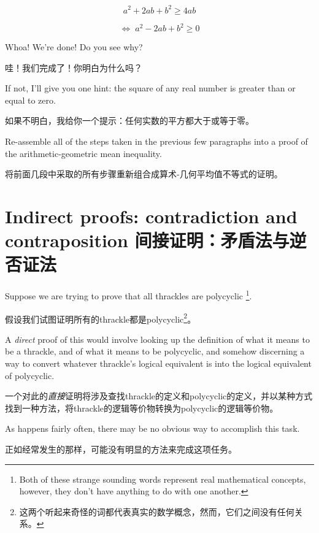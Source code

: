 \[  a^2+2ab+b^2 \geq 4ab \]

\[ \iff \; a^2-2ab+b^2 \geq 0 \]

Whoa!  We're done!  Do you see why?

哇！我们完成了！你明白为什么吗？

If not, I'll give you one
hint:  the square of any real number is greater than or equal to
zero.

如果不明白，我给你一个提示：任何实数的平方都大于或等于零。

\begin{exer}
      Re-assemble all of the steps taken in the previous few paragraphs
      into a proof of the arithmetic-geometric mean inequality.

      将前面几段中采取的所有步骤重新组合成算术-几何平均值不等式的证明。
\end{exer}


\clearpage




\newpage


\section[Contradiction and contraposition]{Indirect proofs: contradiction and contraposition 间接证明：矛盾法与逆否证法}
\label{sec:contra}

Suppose we are trying to prove that all thrackles are polycyclic
\footnote{Both of these strange sounding words represent real
      mathematical concepts, however, they don't have anything to do
      with one another.}.

假设我们试图证明所有的thrackle都是polycyclic\footnote{这两个听起来奇怪的词都代表真实的数学概念，然而，它们之间没有任何关系。}。

A {\em direct} proof of this would involve looking up the definition
of what it means to be a thrackle, and of what it means to be polycyclic,
and somehow discerning a way to convert whatever thrackle's logical equivalent
is into the logical equivalent of polycyclic.

一个对此的{\em 直接}证明将涉及查找thrackle的定义和polycyclic的定义，并以某种方式找到一种方法，将thrackle的逻辑等价物转换为polycyclic的逻辑等价物。

As happens fairly often,
there may be no obvious way to accomplish this task.

正如经常发生的那样，可能没有明显的方法来完成这项任务。

